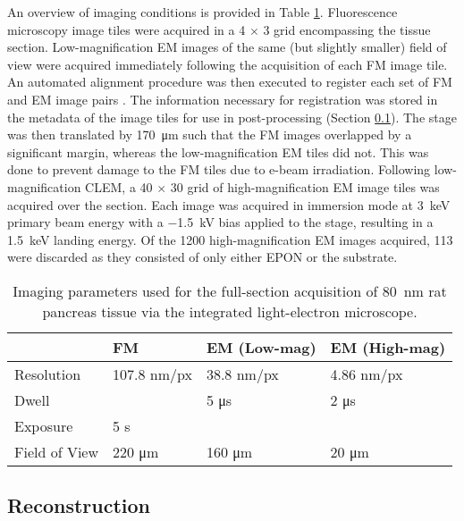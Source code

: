 An overview of imaging conditions is provided in Table \ref{table:2.4_params}. Fluorescence microscopy image tiles were acquired in a 4 $\times$ 3 grid encompassing the tissue section. Low-magnification EM images of the same (but slightly smaller) field of view were acquired immediately following the acquisition of each FM image tile. An automated alignment procedure was then executed to register each set of FM and EM image pairs \cite{haring2017automated}. The information necessary for registration was stored in the metadata of the image tiles for use in post-processing (Section \ref{sec:2.4.5_reconstruction}). The stage was then translated by \SI{170}{\micro\meter} such that the FM images overlapped by a significant margin, whereas the low-magnification EM tiles did not. This was done to prevent damage to the FM tiles due to e-beam irradiation. Following low-magnification CLEM, a 40 $\times$ 30 grid of high-magnification EM image tiles was acquired over the section. Each image was acquired in immersion mode at \SI{3}{\kilo\electronvolt} primary beam energy with a \SI{-1.5}{\kilo\volt} bias applied to the stage, resulting in a \SI{1.5}{\kilo\electronvolt} landing energy. Of the 1200 high-magnification EM images acquired, 113 were discarded as they consisted of only either EPON or the substrate.
%
\begin{table}[!tbh]
    \centering
    \caption{Imaging parameters used for the full-section acquisition of \SI{80}{\nano\meter} rat pancreas tissue via the integrated light-electron microscope.}
    \begin{tabular*}{\textwidth}{@{\extracolsep{\fill}}llll@{}}
    \toprule
    & \textbf{FM} & \textbf{EM (Low-mag)} & \textbf{EM (High-mag)} \\ \midrule
    Resolution    & 107.8 nm/px & 38.8 nm/px            & 4.86 nm/px             \\
    Dwell         &             & 5 μs                  & 2 μs                   \\
    Exposure      & 5 s         &                       &                        \\
    Field of View & 220 μm      & 160 μm                & 20 μm                  \\ \bottomrule
    \end{tabular*}
    \label{table:2.4_params}
\end{table}


\subsection{Reconstruction}
\label{sec:2.4.5_reconstruction}

